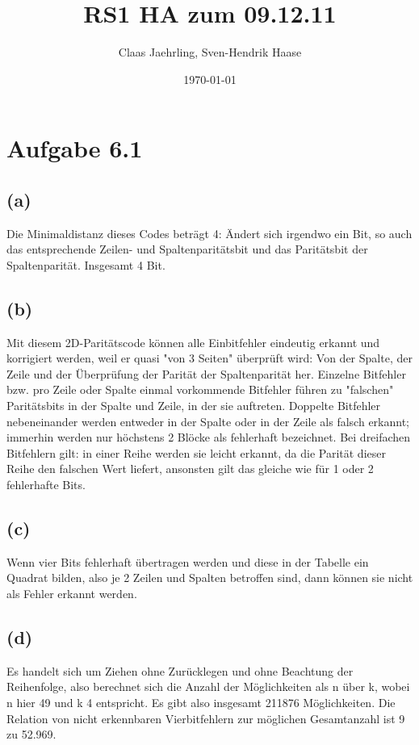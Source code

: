 \documentclass[12pt]{article}
\author{Claas Jaehrling, Sven-Hendrik Haase}
\title{RS1 HA zum 09.12.11}
\date{\today}
\begin{document}
\setcounter{secnumdepth}{0}
\maketitle

\section{Aufgabe 6.1}
\subsection{(a)}
Die Minimaldistanz dieses Codes beträgt 4:
Ändert sich irgendwo ein Bit, so auch das entsprechende Zeilen-
und Spaltenparitätsbit und das Paritätsbit der Spaltenparität.
Insgesamt 4 Bit.

\subsection{(b)}
Mit diesem 2D-Paritätscode können alle Einbitfehler eindeutig
erkannt und korrigiert werden, weil er quasi "von 3 Seiten"
überprüft wird:
Von der Spalte, der Zeile und der Überprüfung der
Parität der Spaltenparität her.
Einzelne Bitfehler bzw. pro Zeile oder Spalte einmal vorkommende 
Bitfehler führen zu "falschen" Paritätsbits in der Spalte und Zeile,
in der sie auftreten.
Doppelte Bitfehler nebeneinander werden entweder in der Spalte
oder in der Zeile als falsch erkannt; immerhin werden nur
höchstens 2 Blöcke als fehlerhaft bezeichnet.
Bei dreifachen Bitfehlern gilt: in einer Reihe werden sie leicht
erkannt, da die Parität dieser Reihe den falschen Wert liefert,
ansonsten gilt das gleiche wie für 1 oder 2 fehlerhafte Bits.

\subsection{(c)}
Wenn vier Bits fehlerhaft übertragen werden und diese in
der Tabelle ein Quadrat bilden, also je 2 Zeilen und Spalten
betroffen sind, dann können sie nicht als Fehler erkannt werden.

\subsection{(d)}
Es handelt sich um Ziehen ohne Zurücklegen und ohne
Beachtung der Reihenfolge, also berechnet sich die Anzahl
der Möglichkeiten als n über k, wobei n hier 49
und k 4 entspricht.
Es gibt also insgesamt 211876 Möglichkeiten.
Die Relation von nicht erkennbaren Vierbitfehlern zur möglichen
Gesamtanzahl ist 9 zu 52.969.
\end{document}
